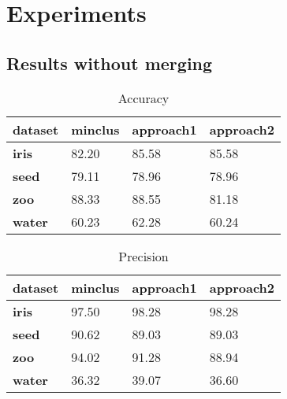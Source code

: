 \chapter{Experiments}
\label{Chapter5}


\section{Results without merging}

\begin{table}[ht]
\caption{Accuracy} 
\begin{center}
		\begin{tabular}{ | l | l | l | l |}
				\hline

				\textbf{dataset} & \textbf{minclus} & \textbf{approach1} & \textbf{approach2} \\ \hline
                \textbf{iris} & 82.20 & 85.58 & 85.58 \\ \hline
                \textbf{seed} & 79.11 & 78.96 & 78.96 \\ \hline
                \textbf{zoo} & 88.33 & 88.55 & 81.18  \\ \hline
                \textbf{water} & 60.23 & 62.28 & 60.24  \\ \hline
		\end{tabular}
\end{center}
\label{table:acc}
\end{table}



\begin{table}[ht]
\caption{Precision} 
\begin{center}
		\begin{tabular}{ | l | l | l | l |}
				\hline

				\textbf{dataset} & \textbf{minclus} & \textbf{approach1} & \textbf{approach2} \\ \hline

				\textbf{iris} & 97.50 & 98.28 & 98.28 \\ \hline
				\textbf{seed} & 90.62 & 89.03 & 89.03 \\ \hline
				\textbf{zoo} & 94.02 & 91.28 & 88.94  \\ \hline
				\textbf{water} & 36.32 & 39.07 & 36.60 \\ \hline
		\end{tabular}
\end{center}
\label{table:pre}
\end{table}


